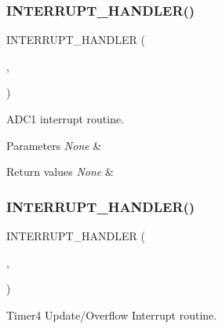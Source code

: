 \subsubsection{\texorpdfstring{I\+N\+T\+E\+R\+R\+U\+P\+T\+\_\+\+H\+A\+N\+D\+L\+E\+R()}{INTERRUPT\_HANDLER()}\hspace{0.1cm}{\footnotesize\ttfamily [14/16]}}
{\footnotesize\ttfamily I\+N\+T\+E\+R\+R\+U\+P\+T\+\_\+\+H\+A\+N\+D\+L\+ER (\begin{DoxyParamCaption}\item[{A\+D\+C1\+\_\+\+I\+R\+Q\+Handler}]{,  }\item[{22}]{ }\end{DoxyParamCaption})}



A\+D\+C1 interrupt routine. 


\begin{DoxyParams}{Parameters}
{\em None} & \\
\hline
\end{DoxyParams}

\begin{DoxyRetVals}{Return values}
{\em None} & \\
\hline
\end{DoxyRetVals}
\mbox{\label{group___u_a_r_t1___printf_ga7c6573228cfa8de176b2a10d78339bb8}} 
\subsubsection{\texorpdfstring{I\+N\+T\+E\+R\+R\+U\+P\+T\+\_\+\+H\+A\+N\+D\+L\+E\+R()}{INTERRUPT\_HANDLER()}\hspace{0.1cm}{\footnotesize\ttfamily [15/16]}}
{\footnotesize\ttfamily I\+N\+T\+E\+R\+R\+U\+P\+T\+\_\+\+H\+A\+N\+D\+L\+ER (\begin{DoxyParamCaption}\item[{T\+I\+M4\+\_\+\+U\+P\+D\+\_\+\+O\+V\+F\+\_\+\+I\+R\+Q\+Handler}]{,  }\item[{23}]{ }\end{DoxyParamCaption})}



Timer4 Update/\+Overflow Interrupt routine. 


